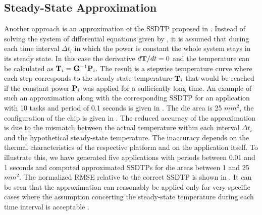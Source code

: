 \subsection{Steady-State Approximation} \label{sec:steady-state-approximation}
Another approach is an approximation of the SSDTP proposed in \cite{huang2009}. Instead of solving the system of differential equations given by , it is assumed that during each time interval $\Delta t_i$ in which the power is constant the whole system stays in its steady state. In this case the derivative \mbox{$d\mathbf{T}/dt = 0$} and the temperature can be calculated as $\mathbf{T}_i = \mathbf{G}^{-1} \mathbf{P}_i$.
The result is a stepwise temperature curve where each step corresponds to the steady-state temperature $\mathbf{T}_i$ that would be reached if the constant power $\mathbf{P}_i$ was applied for a sufficiently long time. An example of such an approximation along with the corresponding SSDTP for an application with 10 tasks and period of 0.1 seconds is given in . The die area is 25 $mm^2$, the configuration of the chip is given in . The reduced accuracy of the approximation is due to the mismatch between the actual temperature within each interval $\Delta t_i$ and the hypothetical steady-state temperature. The inaccuracy depends on the thermal characteristics of the respective platform and on the application itself. To illustrate this, we have generated five applications with periods between 0.01 and 1 seconds and computed approximated SSDTPs for die areas between 1 and 25 $mm^2$. The normalized RMSE relative to the correct SSDTP is shown in . It can be seen that the approximation can reasonably be applied only for very specific cases where the assumption concerting the steady-state temperature during each time interval is acceptable \cite{huang2009}.
